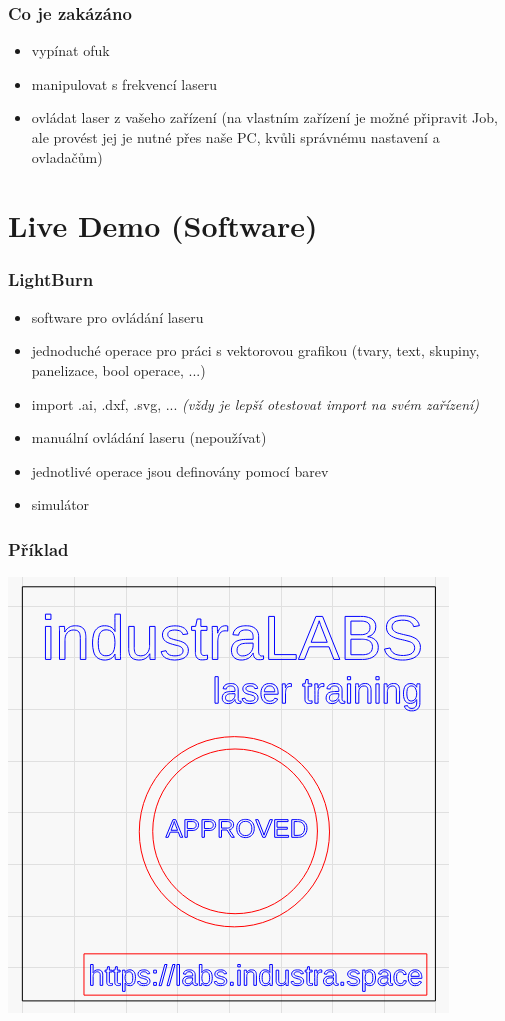 \documentclass[14pt]{beamer}
\begin{document}
\begin{frame}
\frametitle{Co je zakázáno}

\begin{itemize}
	\item vypínat ofuk
	\item manipulovat s frekvencí laseru
	\item ovládat laser z vašeho zařízení (na vlastním zařízení je možné připravit Job, ale provést jej je nutné přes naše PC, kvůli správnému nastavení a ovladačům)
\end{itemize}


\end{frame}



\section{Live Demo (Software)}

\begin{frame}
\frametitle{LightBurn}

\begin{itemize}
	\item software pro ovládání laseru
	\item jednoduché operace pro práci s vektorovou grafikou (tvary, text, skupiny, panelizace, bool operace, ...)
	\item import .ai, .dxf, .svg, ... \textit{(vždy je lepší otestovat import na svém zařízení)}
	\item manuální ovládání laseru (nepoužívat)
	\item jednotlivé operace jsou definovány pomocí barev
	\item simulátor
\end{itemize}


\end{frame}

\begin{frame}
\frametitle{Příklad}
\centering
\includegraphics[scale=0.5]{imgs/lb_example.png}

\end{frame}
\end{document}
